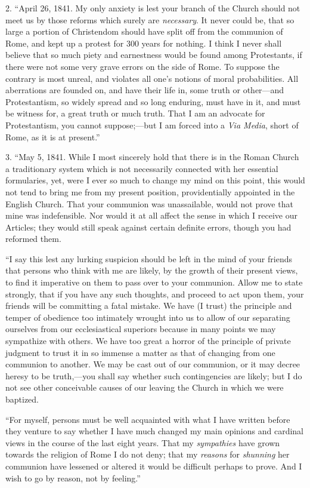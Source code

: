 2. ``April 26, 1841. My only anxiety is lest your branch of the
Church should not meet us by those reforms which surely are \emph{necessary}.
It never could be, that so large a portion of Christendom should have
split off from the communion of Rome, and kept up a protest for 300
years for nothing. I think I never shall believe that so much piety and
earnestness would be found among Protestants, if there were not some
very grave errors on the side of Rome. To suppose the contrary is most
unreal, and violates all one's notions of moral probabilities. All
aberrations are founded on, and have their life in, some truth or other—and
Protestantism, so widely spread and so long enduring, must have in it,
and must be witness for, a great truth or much truth. That I am an
advocate for Protestantism, you cannot suppose;—but I am forced into a \emph{Via
Media}, short of Rome, as it is at present.''

3. ``May 5, 1841. While I most sincerely hold that there is in
the Roman Church a traditionary system which is not necessarily
connected with her essential formularies, yet, were I ever so much to
change my mind on this point, this would not tend to bring me from my
present position, providentially appointed in the English Church.
That your communion was unassailable, would not prove that mine was
indefensible. Nor would it at all affect the sense in which I receive
our Articles; they would still speak against certain definite errors,
though you had reformed them.

``I say this lest any lurking suspicion should be left in the
mind of your friends that persons who think with me are likely, by the
growth of their present views, to find it imperative on them to pass
over to your communion. Allow me to state strongly, that if you have any
such thoughts, and proceed to act upon them, your friends will be
committing a fatal mistake. We have (I trust) the principle and temper
of obedience too intimately wrought into us to allow of our separating
ourselves from our ecclesiastical superiors because in many points we
may sympathize with others. We have too great a horror of the principle
of private judgment to trust it in so immense a matter as that of
changing from one communion to another. We may be cast out of our
communion, or it may decree heresy to be truth,—you shall say whether
such contingencies are likely; but I do not see other conceivable
causes of our leaving the Church in which we were baptized.

``For myself, persons must be well acquainted with what I have written
before they venture to say whether I have much changed my main opinions
and cardinal views in the course of the last eight years. That my \emph{sympathies}
have grown towards the religion of Rome I do not deny; that my \emph{reasons}
for \emph{shunning} her communion have lessened or altered it would be
difficult perhaps to prove. And I wish to go by reason, not by
feeling.''

